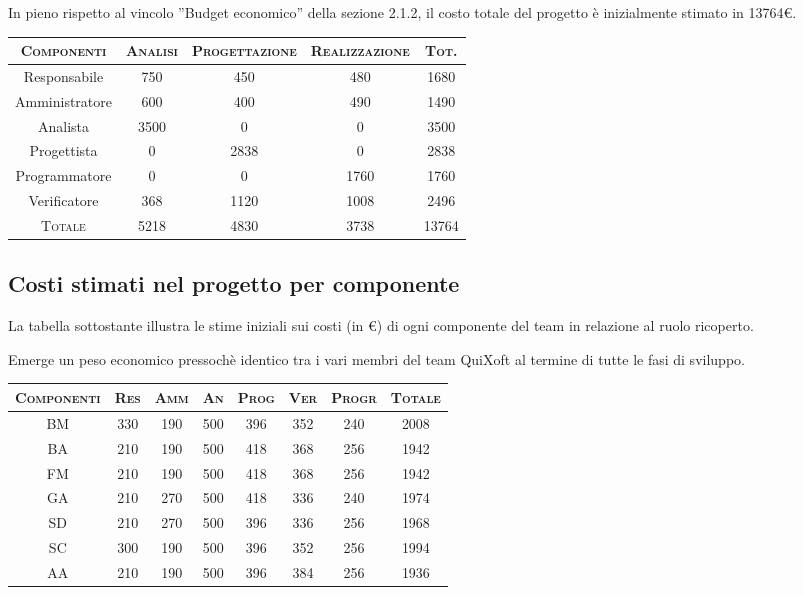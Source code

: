 \documentclass[11pt,a4paper]{article}
\begin{document}
In pieno rispetto al vincolo ''Budget economico'' della sezione 2.1.2, il costo totale del progetto è inizialmente stimato in 13764\euro.
\begin{center}
\begin{tabular}{|c||c|c|c||c|}
\hline
\textsc{Componenti}& \textsc{Analisi} & \textsc{Progettazione} & \textsc{Realizzazione} & \textsc{Tot.} \\ \hline \hline
Responsabile & 750 & 450 & 480 & 1680 \\ \hline
Amministratore & 600 & 400 & 490 & 1490 \\ \hline
Analista & 3500 & 0 & 0 & 3500 \\ \hline
Progettista & 0 & 2838 & 0 & 2838 \\ \hline
Programmatore & 0 & 0 & 1760 & 1760 \\ \hline
Verificatore & 368 & 1120 & 1008 & 2496 \\ \hline \hline
\textsc{Totale} & 5218 & 4830 & 3738 & 13764 \\ \hline
\end{tabular}
\end{center}
\subsection{Costi stimati nel progetto per componente}
La tabella sottostante illustra le stime iniziali sui costi (in \euro) di ogni componente del team in relazione al ruolo ricoperto.

Emerge un peso economico pressochè identico tra i vari membri del team QuiXoft al termine di tutte le fasi di sviluppo.
\begin{center}
\begin{tabular}{|c||c|c|c|c|c|c||c|}
\hline
\textsc{Componenti} & \textsc{Res} & \textsc{Amm} & \textsc{An} & \textsc{Prog} & \textsc{Ver} & \textsc{Progr} & \textsc{Totale}\\
\hline \hline
BM & 330 & 190 & 500 & 396 & 352 & 240 & 2008 \\ \hline
BA & 210 & 190 & 500 & 418 & 368 & 256 & 1942 \\ \hline
FM & 210 & 190 & 500 & 418 & 368 & 256 & 1942 \\ \hline
GA & 210 & 270 & 500 & 418 & 336 & 240 & 1974 \\ \hline
SD & 210 & 270 & 500 & 396 & 336 & 256 & 1968 \\ \hline
SC & 300 & 190 & 500 & 396 & 352 & 256 & 1994 \\ \hline
AA & 210 & 190 & 500 & 396 & 384 & 256 & 1936 \\ \hline
\end{tabular}
\end{center}
\end{document}
